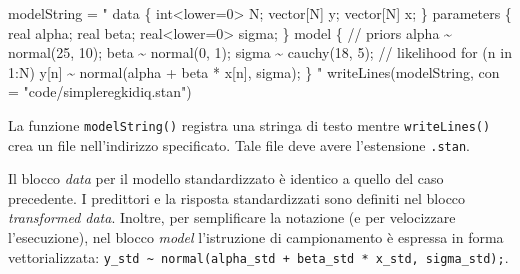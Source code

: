 \documentclass[
]{memoir}
\newenvironment{Shaded}{\begin{snugshade}}{\end{snugshade}}
\newcommand{\AttributeTok}[1]{\textcolor[rgb]{0.77,0.63,0.00}{#1}}
\newcommand{\FunctionTok}[1]{\textcolor[rgb]{0.00,0.00,0.00}{#1}}
\newcommand{\NormalTok}[1]{#1}
\newcommand{\OtherTok}[1]{\textcolor[rgb]{0.56,0.35,0.01}{#1}}
\newcommand{\StringTok}[1]{\textcolor[rgb]{0.31,0.60,0.02}{#1}}
\begin{document}
\begin{Shaded}
\begin{Highlighting}[]
\NormalTok{modelString }\OtherTok{=} \StringTok{"}
\StringTok{data \{}
\StringTok{  int\textless{}lower=0\textgreater{} N;}
\StringTok{  vector[N] y;}
\StringTok{  vector[N] x;}
\StringTok{\}}
\StringTok{parameters \{}
\StringTok{  real alpha;}
\StringTok{  real beta;}
\StringTok{  real\textless{}lower=0\textgreater{} sigma;}
\StringTok{\}}
\StringTok{model \{}
\StringTok{  // priors}
\StringTok{  alpha \textasciitilde{} normal(25, 10);}
\StringTok{  beta \textasciitilde{} normal(0, 1);}
\StringTok{  sigma \textasciitilde{} cauchy(18, 5);}
\StringTok{  // likelihood}
\StringTok{  for (n in 1:N)}
\StringTok{    y[n] \textasciitilde{} normal(alpha + beta * x[n], sigma);}
\StringTok{\}}
\StringTok{"}
\FunctionTok{writeLines}\NormalTok{(modelString, }\AttributeTok{con =} \StringTok{"code/simpleregkidiq.stan"}\NormalTok{)}
\end{Highlighting}
\end{Shaded}

La funzione \texttt{modelString()} registra una stringa di testo mentre \texttt{writeLines()} crea un file nell'indirizzo specificato. Tale file deve avere l'estensione \texttt{.stan}.

Il blocco \emph{data} per il modello standardizzato è identico a quello del caso precedente. I predittori e la risposta standardizzati sono definiti nel blocco \emph{transformed data}. Inoltre, per semplificare la notazione (e per velocizzare l'esecuzione), nel blocco \emph{model} l'istruzione di campionamento è espressa in forma vettorializzata: \texttt{y\_std\ \textasciitilde{}\ normal(alpha\_std\ +\ beta\_std\ *\ x\_std,\ sigma\_std);}.
\end{document}
